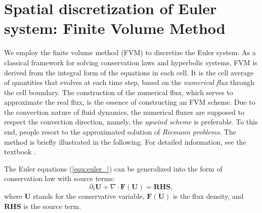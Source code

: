\documentclass{report}
\begin{document}
\section{Spatial discretization of Euler system: Finite Volume Method}
We employ the finite volume method (FVM) to discretize the Euler system. As a classical framework for solving conservation laws and hyperbolic systems, FVM is derived from the integral form of the equations in each cell. It is the cell average of quantities that evolves at each time step, based on the \emph{numerical flux} through the cell boundary. The construction of the numerical flux, which serves to approximate the real flux, is the essence of constructing an FVM scheme. Due to the convection nature of fluid dynamics, the numerical fluxes are supposed to respect the convection direction, namely, the \emph{upwind scheme} is preferable. To this end, people resort to the approximated solution of \emph{Riemann problems}. The method is briefly illustrated in the following. For detailed information, see the textbook \cite{leveque_2002}.

The Euler equations (\ref{equ:euler_}) can be generalized into the form of conservation law with source terms:
\begin{equation} \label{equ:euler_conservation}
    \partial_t \mathbf{U} + \nabla \cdot \mathbf{F}(\mathbf{U}) = \mathbf{RHS},
\end{equation}
where $\mathbf{U}$ stands for the conservative variable, $\mathbf{F}(\mathbf{U})$ is the flux density, and $\mathbf{RHS}$ is the source term. 
\end{document}
